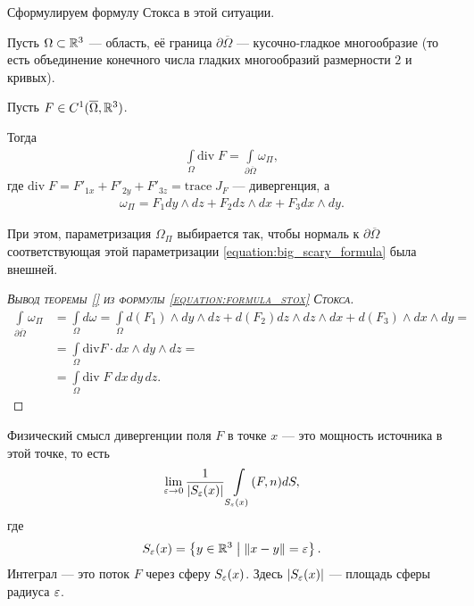 Сформулируем формулу Стокса в этой ситуации.

\begin{thm}
Пусть $\Omega \subset \mathbb{R}^{3}$  --- область, её граница $\partial \overline \Omega$  --- кусочно-гладкое многообразие (то есть объединение конечного числа гладких многообразий размерности $2$ и кривых).

Пусть $F \in C^{1}(\overline \Omega, \mathbb{R}^{3})$.

Тогда
\begin{align*}
 \int\limits_{\Omega} \mathrm{div}\;F  = \int\limits_{\partial \overline \Omega} \omega_{\Pi}
,\end{align*} где $\mathrm{div}\;F = F'_{1x} + F'_{2y} + F'_{3z} = \mathrm{trace}\;J_F$ --- дивергенция, а
\begin{align*}
 \omega_{\Pi} = F_1 dy \land dz + F_2 dz \land dx + F_3 dx \land dy
.\end{align*}

При этом, параметризация $\Omega_{\Pi}$ выбирается так, чтобы нормаль к $\partial \overline \Omega$ соответствующая этой параметризации \eqref{equation:big_scary_formula} была внешней.
\end{thm}
\begin{proof}[\normalfont\textsc{Вывод теоремы \ref{} из формулы \eqref{equation:formula_stox} Стокса}]
 \begin{align*}
  \int\limits_{\partial \overline \Omega} \omega_{\Pi} &= \int\limits_{\Omega} d \omega = \int\limits_{\Omega} d(F_1) \land dy \land dz + d(F_2) dz \land dz \land dx + d(F_3) \land dx \land dy = \\
  &= \int\limits_{\Omega} \mathrm{div} F \cdot dx \land dy \land dz = \\
  &= \int\limits_{\Omega} \mathrm{div}\; F\; dx \, dy \, dz
 .\end{align*} 
\end{proof}

\begin{remrk*}
Физический смысл дивергенции поля $F$ в точке $x$ --- это мощность источника в этой точке, то есть
\begin{align*}
 \lim_{\varepsilon \to 0}  \frac{1}{\left| S_{\varepsilon}(x) \right|} \int\limits_{S_{\varepsilon}(x)} (F, n) dS
,\end{align*} где \begin{align*}
S_{\varepsilon}(x) = \left\{ y \in \mathbb{R}^{3} \;\middle|\; \left\| x - y \right\| = \varepsilon \right\}
.\end{align*} Интеграл --- это поток $F$ через сферу $S_{\varepsilon}(x)$. Здесь $\left| S_{\varepsilon}(x) \right|$ --- площадь сферы радиуса $\varepsilon$.
\end{remrk*}

